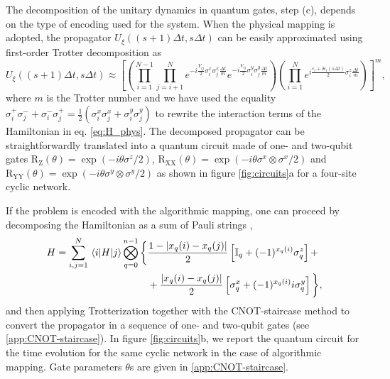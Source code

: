 \documentclass[12pt, amsmath, amssymb, graphicx]{iopart}
\begin{document}
The decomposition of the unitary dynamics in quantum gates, step (c), depends on the type of encoding used for the system. When the physical mapping is adopted, the propagator $U_{\xi}((s+1) \Delta t, s \Delta t)$ can be easily approximated using first-order Trotter decomposition as
%
\begin{equation} \label{eq:Trotter_physical}
    U_{\xi}((s+1) \Delta t, s \Delta t) \approx \left[ \left(\prod_{i=1}^{N-1}\prod_{j=i+1}^{N} e^{-i \frac{V_{ij}}{2} \sigma_{i}^{x} \sigma_{j}^{x} \frac{\Delta t}{m}} e^{-i \frac{V_{ij}}{2} \sigma_{i}^{y} \sigma_{j}^{y} \frac{\Delta t}{m}} \right) \left(\prod_{i=1}^{N} e^{i \frac{\epsilon_{i} + \delta\epsilon_{i}\left(s \Delta t\right)}{2} \sigma_{i}^{z} \frac{\Delta t}{m}} \right)\right]^{m},
\end{equation}
%
where $m$ is the Trotter number and we have used the equality $\sigma_{i}^{+} \sigma_{j}^{-} + \sigma_{i}^{-}\sigma_{j}^{+} = \frac{1}{2} \left( \sigma_{i}^{x} \sigma_{j}^{x} + \sigma_{i}^{y} \sigma_{j}^{y} \right)$ to rewrite the interaction terms of the Hamiltonian in eq. \ref{eq:H_phys}. The decomposed propagator can be straightforwardly translated into a quantum circuit made of one- and two-qubit gates $\text{R}_\text{Z}(\theta) = \exp(-i \theta \sigma^{z}/2)$, $\text{R}_\text{XX}(\theta) = \exp(-i \theta \sigma^{x} \otimes \sigma^{x}/2)$ and $\text{R}_\text{YY}(\theta) = \exp(-i \theta \sigma^{y} \otimes \sigma^{y}/2)$ as shown in figure \ref{fig:circuits}a for a four-site cyclic network.

If the problem is encoded with the algorithmic mapping, one can proceed by decomposing the Hamiltonian as a sum of Pauli strings \cite{Pravatto2021}, 
%
\begin{equation} \label{eq:Hamiltonian_to_Pauli}
\begin{split}
    H = \sum_{i,j=1}^{N} \mel{i}{H}{j} \bigotimes_{q=0}^{n-1} \bigg\{& \frac{1 - \abs{x_{q}(i) - x_{q}(j)}}{2} \left[ \mathbb{I}_{q} + (-1)^{x_{q}(i)} \sigma_{q}^{z} \right] +\\
    &+\frac{\abs{x_{q}(i) - x_{q}(j)}}{2} \left[ \sigma_{q}^{x} + (-1)^{x_{q}(i)} i \sigma^{y}_{q} \right] \bigg\},
\end{split}
\end{equation}
%
and then applying Trotterization together with the CNOT-staircase method to convert the propagator in a sequence of one- and two-qubit gates (see \ref{app:CNOT-staircase}). In figure \ref{fig:circuits}b, we report the quantum circuit for the time evolution for the same cyclic network in the case of algorithmic mapping. Gate parameters $\theta$s are given in \ref{app:CNOT-staircase}.
\end{document}
